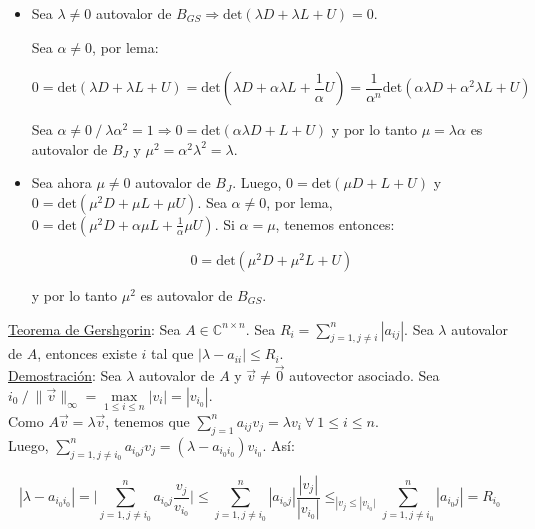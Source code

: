 \begin{itemize}
	\item Sea $\lambda \neq 0$ autovalor de $B_{GS} \Rightarrow \text{det}(\lambda D + \lambda L + U) = 0$.
	
	Sea $\alpha \neq 0$, por lema:
	
	$$0 = \text{det}(\lambda D + \lambda L + U) = \text{det}(\lambda D + \alpha \lambda L + \frac{1}{\alpha}U) = \frac{1}{\alpha^{n}}\text{det}(\alpha \lambda D + \alpha^{2} \lambda L + U)$$
	
	Sea $\alpha \neq 0\ / \ \lambda \alpha^{2} = 1 \Rightarrow 0 = \text{det}(\alpha \lambda D + L + U)$ y por lo tanto $\mu = \lambda \alpha$ es autovalor de $B_{J}$ y $\mu^{2} = \alpha^{2} \lambda^{2} = \lambda$.
	
	\item Sea ahora $\mu \neq 0$ autovalor de $B_{J}$. Luego, $0 = \text{det}(\mu D + L + U)$ y $0 = \text{det}(\mu^{2} D + \mu L + \mu U)$. Sea $\alpha \neq 0$, por lema, $0 = \text{det}(\mu^{2} D + \alpha \mu L + \frac{1}{\alpha}\mu U)$. Si $\alpha = \mu$, tenemos entonces:
	
	$$0 = \text{det}(\mu^{2} D + \mu^{2} L + U)$$
	
	y por lo tanto $\mu^{2}$ es autovalor de $B_{GS}$.\\
\end{itemize}

\underline{Teorema de Gershgorin}: Sea $A \in \mathbb{C}^{n \times n}$. Sea $R_{i} = \sum \limits_{j = 1, j \neq i}^{n} |a_{ij}|$. Sea $\lambda$ autovalor de $A$, entonces existe $i$ tal que $|\lambda - a_{ii}| \leq R_{i}$.\\

\underline{Demostraci\'on}: Sea $\lambda$ autovalor de $A$ y $\Vec{v} \neq \Vec{0}$ autovector asociado. Sea $i_{0}\ / \ \|\Vec{v}\|_{\infty} = \max \limits_{1 \leq i \leq n} |v_{i}| = |v_{i_{0}}|$.\\

Como $A\Vec{v} = \lambda \Vec{v}$, tenemos que $\sum \limits_{j = 1}^{n} a_{ij}v_{j} = \lambda v_{i}\ \forall \ 1 \leq i \leq n$.\\

Luego, $\sum \limits_{j = 1, j \neq i_{0}}^{n} a_{i_{0}j}v_{j} = (\lambda - a_{i_{0}i_{0}})v_{i_{0}}$. As\'i:

$$|\lambda - a_{i_{0}i_{0}}| = \bigg| \sum \limits_{j = 1, j \neq i_{0}}^{n} a_{i_{0}j}\frac{v_{j}}{v_{i_{0}}} \bigg| \leq \sum \limits_{j = 1, j \neq i_{0}}^{n} |a_{i_{0}j}|\frac{|v_{j}|}{|v_{i_{0}}|} \leq_{|v_{j} \leq |v_{i_{0}}|} \sum \limits_{j = 1, j \neq i_{0}}^{n} |a_{i_{0}j}| = R_{i_{0}}$$

